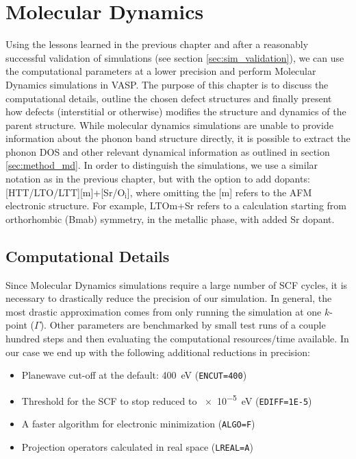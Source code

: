 \chapter{Molecular Dynamics}\label{ch:md}
Using the lessons learned in the previous chapter and after a reasonably successful validation of simulations (see section \ref{sec:sim_validation}), we can use the computational parameters at a lower precision and perform Molecular Dynamics simulations in VASP. The purpose of this chapter is to discuss the computational details, outline the chosen defect structures and finally present how defects (interstitial or otherwise) modifies the structure and dynamics of the parent structure. While molecular dynamics simulations are unable to provide information about the phonon band structure directly, it is possible to extract the phonon DOS and other relevant dynamical information as outlined in section \ref{sec:method_md}. In order to distinguish the simulations, we use a similar notation as in the previous chapter, but with the option to add dopants: [HTT/LTO/LTT][m]+[Sr/O$_\text{i}$], where omitting the [m] refers to the AFM electronic structure. For example, LTOm+Sr refers to a calculation starting from orthorhombic (Bmab) symmetry, in the metallic phase, with added Sr dopant.

\section{Computational Details}
Since Molecular Dynamics simulations require a large number of SCF cycles, it is necessary to drastically reduce the precision of our simulation. In general, the most drastic approximation comes from only running the simulation at one $k$-point ($\Gamma$). Other parameters are benchmarked by small test runs of a couple hundred steps and then evaluating the computational resources/time available. In our case we end up with the following additional reductions in precision:

\begin{itemize}
	\item Planewave cut-off at the default: \SI{400}{\eV} (\texttt{ENCUT=400})
	\item Threshold for the SCF to stop reduced to \SI{e-5}{\eV} (\texttt{EDIFF=1E-5})
	\item A faster algorithm for electronic minimization (\texttt{ALGO=F})
	\item Projection operators calculated in real space (\texttt{LREAL=A})
\end{itemize}

